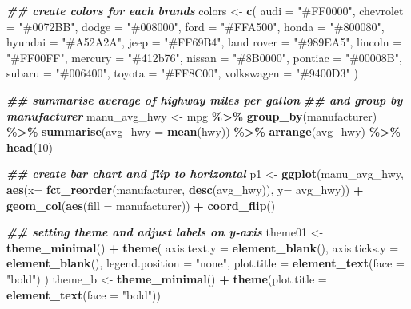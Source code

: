 \documentclass[
]{article}
\newenvironment{Shaded}{\begin{snugshade}}{\end{snugshade}}
\newcommand{\AttributeTok}[1]{\textcolor[rgb]{0.13,0.29,0.53}{#1}}
\newcommand{\DecValTok}[1]{\textcolor[rgb]{0.00,0.00,0.81}{#1}}
\newcommand{\DocumentationTok}[1]{\textcolor[rgb]{0.56,0.35,0.01}{\textbf{\textit{#1}}}}
\newcommand{\FunctionTok}[1]{\textcolor[rgb]{0.13,0.29,0.53}{\textbf{#1}}}
\newcommand{\NormalTok}[1]{#1}
\newcommand{\OtherTok}[1]{\textcolor[rgb]{0.56,0.35,0.01}{#1}}
\newcommand{\SpecialCharTok}[1]{\textcolor[rgb]{0.81,0.36,0.00}{\textbf{#1}}}
\newcommand{\StringTok}[1]{\textcolor[rgb]{0.31,0.60,0.02}{#1}}
\begin{document}
\begin{Shaded}
\begin{Highlighting}[]
\DocumentationTok{\#\# create colors for each brands}
\NormalTok{colors }\OtherTok{\textless{}{-}} \FunctionTok{c}\NormalTok{(}
  \AttributeTok{audi =} \StringTok{"\#FF0000"}\NormalTok{, }\AttributeTok{chevrolet =} \StringTok{"\#0072BB"}\NormalTok{, }\AttributeTok{dodge =} \StringTok{"\#008000"}\NormalTok{, }\AttributeTok{ford =} \StringTok{"\#FFA500"}\NormalTok{, }\AttributeTok{honda =} \StringTok{"\#800080"}\NormalTok{,}
  \AttributeTok{hyundai =} \StringTok{"\#A52A2A"}\NormalTok{, }\AttributeTok{jeep =} \StringTok{"\#FF69B4"}\NormalTok{, }\StringTok{\textasciigrave{}}\AttributeTok{land rover}\StringTok{\textasciigrave{}} \OtherTok{=} \StringTok{"\#989EA5"}\NormalTok{, }\AttributeTok{lincoln =} \StringTok{"\#FF00FF"}\NormalTok{,}
  \AttributeTok{mercury =} \StringTok{"\#412b76"}\NormalTok{, }\AttributeTok{nissan =} \StringTok{"\#8B0000"}\NormalTok{, }\AttributeTok{pontiac =} \StringTok{"\#00008B"}\NormalTok{, }\AttributeTok{subaru =} \StringTok{"\#006400"}\NormalTok{,}
  \AttributeTok{toyota =} \StringTok{"\#FF8C00"}\NormalTok{, }\AttributeTok{volkswagen =} \StringTok{"\#9400D3"}
\NormalTok{)}

\DocumentationTok{\#\# summarise average of highway miles per gallon}
\DocumentationTok{\#\# and group by manufacturer}
\NormalTok{manu\_avg\_hwy }\OtherTok{\textless{}{-}}\NormalTok{ mpg }\SpecialCharTok{\%\textgreater{}\%}
  \FunctionTok{group\_by}\NormalTok{(manufacturer) }\SpecialCharTok{\%\textgreater{}\%}
  \FunctionTok{summarise}\NormalTok{(}\AttributeTok{avg\_hwy =} \FunctionTok{mean}\NormalTok{(hwy)) }\SpecialCharTok{\%\textgreater{}\%}
  \FunctionTok{arrange}\NormalTok{(avg\_hwy) }\SpecialCharTok{\%\textgreater{}\%}
  \FunctionTok{head}\NormalTok{(}\DecValTok{10}\NormalTok{)}

\DocumentationTok{\#\# create bar chart and flip to horizontal}
\NormalTok{p1 }\OtherTok{\textless{}{-}} \FunctionTok{ggplot}\NormalTok{(manu\_avg\_hwy, }\FunctionTok{aes}\NormalTok{(}\AttributeTok{x=} \FunctionTok{fct\_reorder}\NormalTok{(manufacturer, }\FunctionTok{desc}\NormalTok{(avg\_hwy)), }\AttributeTok{y=}\NormalTok{ avg\_hwy)) }\SpecialCharTok{+}
  \FunctionTok{geom\_col}\NormalTok{(}\FunctionTok{aes}\NormalTok{(}\AttributeTok{fill =}\NormalTok{ manufacturer)) }\SpecialCharTok{+} \FunctionTok{coord\_flip}\NormalTok{()}

\DocumentationTok{\#\# setting theme and adjust labels on y{-}axis}
\NormalTok{theme01 }\OtherTok{\textless{}{-}} \FunctionTok{theme\_minimal}\NormalTok{() }\SpecialCharTok{+}
  \FunctionTok{theme}\NormalTok{(}
    \AttributeTok{axis.text.y =} \FunctionTok{element\_blank}\NormalTok{(),}
    \AttributeTok{axis.ticks.y =} \FunctionTok{element\_blank}\NormalTok{(),}
    \AttributeTok{legend.position =} \StringTok{"none"}\NormalTok{,}
    \AttributeTok{plot.title =} \FunctionTok{element\_text}\NormalTok{(}\AttributeTok{face =} \StringTok{"bold"}\NormalTok{)}
\NormalTok{  ) }
\NormalTok{theme\_b }\OtherTok{\textless{}{-}} \FunctionTok{theme\_minimal}\NormalTok{() }\SpecialCharTok{+}
  \FunctionTok{theme}\NormalTok{(}\AttributeTok{plot.title =} \FunctionTok{element\_text}\NormalTok{(}\AttributeTok{face =} \StringTok{"bold"}\NormalTok{))}


\end{Highlighting}
\end{Shaded}
\end{document}
